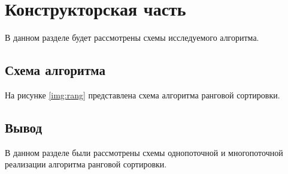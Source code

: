 \chapter{Конструкторская часть}
В данном разделе будет рассмотрены схемы исследуемого алгоритма.

\section{Схема алгоритма}

На рисунке \ref{img:rang} представлена схема алгоритма ранговой сортировки.


\section*{Вывод}

В данном разделе были рассмотрены схемы однопоточной и
многопоточной реализации алгоритма ранговой сортировки.
